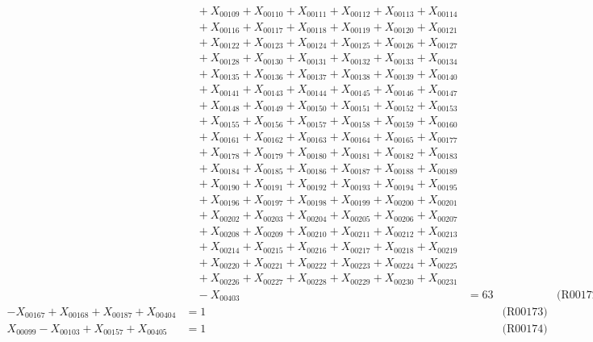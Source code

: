 \documentclass[a4paper,10pt]{article}
\begin{document}
{\begin{align}
&\quad  + X_{00109} + X_{00110} + X_{00111} + X_{00112} + X_{00113} + X_{00114} \\[0.5ex]
&\quad  + X_{00116} + X_{00117} + X_{00118} + X_{00119} + X_{00120} + X_{00121} \\[0.5ex]
&\quad  + X_{00122} + X_{00123} + X_{00124} + X_{00125} + X_{00126} + X_{00127} \\[0.5ex]
&\quad  + X_{00128} + X_{00130} + X_{00131} + X_{00132} + X_{00133} + X_{00134} \\[0.5ex]
&\quad  + X_{00135} + X_{00136} + X_{00137} + X_{00138} + X_{00139} + X_{00140} \\[0.5ex]
&\quad  + X_{00141} + X_{00143} + X_{00144} + X_{00145} + X_{00146} + X_{00147} \\[0.5ex]
&\quad  + X_{00148} + X_{00149} + X_{00150} + X_{00151} + X_{00152} + X_{00153} \\[0.5ex]
&\quad  + X_{00155} + X_{00156} + X_{00157} + X_{00158} + X_{00159} + X_{00160} \\[0.5ex]
&\quad  + X_{00161} + X_{00162} + X_{00163} + X_{00164} + X_{00165} + X_{00177} \\[0.5ex]
&\quad  + X_{00178} + X_{00179} + X_{00180} + X_{00181} + X_{00182} + X_{00183} \\[0.5ex]
&\quad  + X_{00184} + X_{00185} + X_{00186} + X_{00187} + X_{00188} + X_{00189} \\[0.5ex]
&\quad  + X_{00190} + X_{00191} + X_{00192} + X_{00193} + X_{00194} + X_{00195} \\[0.5ex]
&\quad  + X_{00196} + X_{00197} + X_{00198} + X_{00199} + X_{00200} + X_{00201} \\[0.5ex]
&\quad  + X_{00202} + X_{00203} + X_{00204} + X_{00205} + X_{00206} + X_{00207} \\[0.5ex]
&\quad  + X_{00208} + X_{00209} + X_{00210} + X_{00211} + X_{00212} + X_{00213} \\[0.5ex]
&\quad  + X_{00214} + X_{00215} + X_{00216} + X_{00217} + X_{00218} + X_{00219} \\[0.5ex]
&\quad  + X_{00220} + X_{00221} + X_{00222} + X_{00223} + X_{00224} + X_{00225} \\[0.5ex]
&\quad  + X_{00226} + X_{00227} + X_{00228} + X_{00229} + X_{00230} + X_{00231} \\[0.5ex]
&\quad  - X_{00403} &= 63 && \text{(R00172)} \\
-X_{00167} + X_{00168} + X_{00187} + X_{00404} &= 1 && \text{(R00173)} \\
X_{00099} - X_{00103} + X_{00157} + X_{00405} &= 1 && \text{(R00174)} \\

\end{align}}
\end{document}
